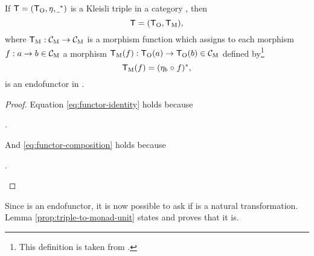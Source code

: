 \begin{proposition}
  \label{prop:triple-to-endofunctor}
  If $\mathsf{T} = (\mathsf{T}_{\operatorname{O}}, \eta, \underline{~}^*)$ is a Kleisli triple in
  a category , then
  \begin{equation*}
    \mathsf{T} = (\mathsf{T}_{\operatorname{O}}, \mathsf{T}_{\operatorname{M}})
    \text{,}
  \end{equation*}
  where $\mathsf{T}_{\operatorname{M}}: \mathcal{C}_{\operatorname{M}} \to \mathcal{C}_{\operatorname{M}}$ is a morphism function
  which assigns to each morphism $f: a \to b \in \mathcal{C}_{\operatorname{M}}$ a morphism
  $\mathsf{T}_{\operatorname{M}}(f): \mathsf{T}_{\operatorname{O}}(a) \to \mathsf{T}_{\operatorname{O}}(b) \in \mathcal{C}_{\operatorname{M}}$ defined
  by\footnote{This definition is taken from
    \parencite[61]{moggi-1991}.}
  \begin{equation}
    \label{eq:triple-to-endofunctor-morphism-function}
    \mathsf{T}_{\operatorname{M}}(f) = (\eta_{b} \mathrel{\circ} f)^*
    \text{,}
  \end{equation}
  is an endofunctor in .
  \begin{proof}
    Equation \eqref{eq:functor-identity} holds because
    \begin{steps}
      .
    \end{steps}
    And \eqref{eq:functor-composition} holds because
    \begin{steps}
      .
    \end{steps}
  \end{proof}
\end{proposition}

Since  is an endofunctor, it is now possible to ask if
\nat{\eta} is a natural transformation. Lemma
\ref{prop:triple-to-monad-unit} states and proves that it is.

